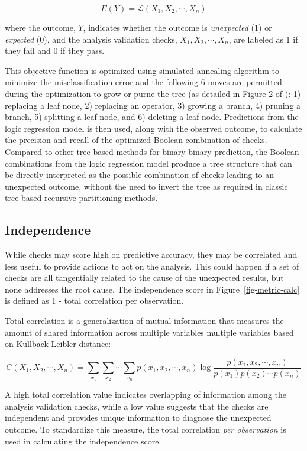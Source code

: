 \documentclass[
  12pt,
]{interact}
\begin{document}
\[E(Y) = \mathcal{L}(X_1, X_2, \cdots, X_n)\]

where the outcome, \(Y\), indicates whether the outcome is
\emph{unexpected} (1) or \emph{expected} (0), and the analysis
validation checks, \(X_1, X_2, \cdots, X_n\), are labeled as 1 if they
fail and 0 if they pass.

This objective function is optimized using simulated annealing algorithm
to minimize the misclassification error and the following 6 moves are
permitted during the optimization to grow or purne the tree (as detailed
in Figure 2 of \citet{ruczinski_logic_2003}): 1) replacing a leaf node,
2) replacing an operator, 3) growing a branch, 4) pruning a branch, 5)
splitting a leaf node, and 6) deleting a leaf node. Predictions from the
logic regression model is then used, along with the observed outcome, to
calculate the precision and recall of the optimized Boolean combination
of checks. Compared to other tree-based methods for binary-binary
prediction, the Boolean combinations from the logic regression model
produce a tree structure that can be directly interpreted as the
possible combination of checks leading to an unexpected outcome, without
the need to invert the tree as required in classic tree-based recursive
partitioning methods.

\subsection{Independence}\label{independence}

While checks may score high on predictive accuracy, they may be
correlated and less useful to provide actions to act on the analysis.
This could happen if a set of checks are all tangentially related to the
cause of the unexpected results, but none addresses the root cause. The
independence score in Figure~\ref{fig-metric-calc} is defined as 1 -
total correlation per observation.

Total correlation is a generalization of mutual information that
measures the amount of shared information across multiple variables
multiple variables based on Kullback-Leibler distance:

\[C(X_1, X_2, \cdots, X_n) = \sum_{x_1} \sum_{x_2} \cdots \sum_{x_n} p(x_1, x_2, \cdots, x_n) \log \frac{p(x_1, x_2, \cdots, x_n)}{p(x_1)p(x_2) \cdots p(x_n)}\]

A high total correlation value indicates overlapping of information
among the analysis validation checks, while a low value suggests that
the checks are independent and provides unique information to diagnose
the unexpected outcome. To standardize this measure, the total
correlation \emph{per observation} is used in calculating the
independence score.
\end{document}
